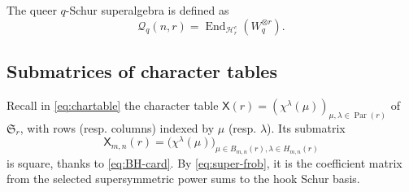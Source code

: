 \documentclass[11pt]{amsart}
\numberwithin{equation}{section}
\theoremstyle{plain}
\theoremstyle{definition}
\theoremstyle{remark}
\begin{document}


The queer $q$-Schur superalgebra is defined as
$$
\mathcal Q_q(n,r)
=\operatorname{End}_{\mathcal H_r^c}(W_q^{\otimes r}).
$$






\subsection{Submatrices of character tables}
\label{subsec:res-matrices}

Recall in \eqref{eq:chartable} the character table $\mathsf{X}(r)=(\chi^\lambda(\mu))_{\mu,\lambda\in\operatorname{Par}(r)}$ of $\mathfrak S_r$, with rows (resp. columns)
indexed by $\mu$ (resp. $\lambda$). Its submatrix
\begin{equation}\label{eq:gl-matrix}
\mathsf{X}_{m,n}(r)
=\bigl(\chi^\lambda(\mu)\bigr)_{\mu\in B_{m,n}(r),
             \lambda\in H_{m,n}(r)}
\end{equation}
is square, thanks to \eqref{eq:BH-card}. By
\eqref{eq:super-frob}, it is the coefficient matrix
from the selected supersymmetric power sums to the hook Schur basis.
\end{document}
